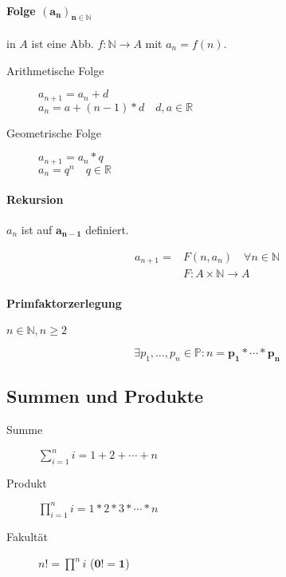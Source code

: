 \paragraph{Folge $\mathbf{(a_n)_{n \in \mathbb{N}}}$} in $A$ ist eine Abb. $f: \mathbb{N} \rightarrow A$ mit $a_n = f(n)$.

\begin{description}
  \item [Arithmetische Folge]
        $a_{n+1} = a_n + d$ \\
        $a_n = a + (n-1) * d \quad d, a \in \mathbb{R}$

  \item [Geometrische Folge]
        $a_{n+1} = a_n * q$ \\
        $a_n = q^n \quad q \in \mathbb{R}$
\end{description}

\paragraph{Rekursion} $a_n$ ist auf $\mathbf{a_{n-1}}$ definiert.

\begin{align*}
  a_{n+1} = & F(n, a_n) \quad \forall n \in \mathbb{N} \\
            & F: A \times \mathbb{N} \rightarrow A
\end{align*}

\paragraph{Primfaktorzerlegung} $n\in \mathbb{N}, n \geq 2$

$$\exists p_1, \dots, p_n \in \mathbb{P}: n = \mathbf{p_1 * \cdots * p_n}$$

\subsection{Summen und Produkte}

\begin{description}
  \item [Summe] $\sum_{i = 1}^n i = 1 + 2 + \cdots + n$

  \item [Produkt] $\prod_{i = 1}^n i = 1 * 2 * 3 * \cdots * n$

  \item [Fakultät] $n! = \prod^n i$ ($\mathbf{0! = 1}$)
\end{description}

